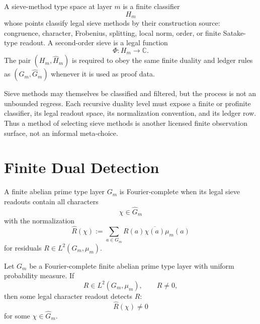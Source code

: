 \begin{definition}
\label{def:rh-sieve-method-type-space}
A sieve-method type space at layer $m$ is a finite classifier
$$
H_m
$$
whose points classify legal sieve methods by their construction source:
congruence, character, Frobenius, splitting, local norm, order, or
finite Satake-type readout.  A second-order sieve is a legal function
$$
\Phi:H_m\to\mathbb C.
$$
The pair $(H_m,\widehat H_m)$ is required to obey the same finite
duality and ledger rules as $(G_m,\widehat G_m)$ whenever it is used as
proof data.
\end{definition}

\begin{principle}
\label{prin:rh-recursive-duality-ledger-bounded}
Sieve methods may themselves be classified and filtered, but the
process is not an unbounded regress.  Each recursive duality level must
expose a finite or profinite classifier, its legal readout space, its
normalization convention, and its ledger row.  Thus a method of
selecting sieve methods is another licensed finite observation surface,
not an informal meta-choice.
\end{principle}

\section{Finite Dual Detection}
\label{sec:rh-prime-sieve-duality-finite-detection}

\begin{definition}
\label{def:rh-fourier-complete-sieve-layer}
A finite abelian prime type layer $G_m$ is Fourier-complete when its
legal sieve readouts contain all characters
$$
\chi\in\widehat G_m
$$
with the normalization
$$
\widehat R(\chi)
:=
\sum_{a\in G_m}R(a)\overline{\chi(a)}\mu_m(a)
$$
for residuals $R\in L^2(G_m,\mu_m)$.
\end{definition}

\begin{theorem}
\label{thm:rh-fourier-complete-finite-layers-detect-nonzero-residuals}
Let $G_m$ be a Fourier-complete finite abelian prime type layer with
uniform probability measure.  If
$$
R\in L^2(G_m,\mu_m),
\qquad
R\ne0,
$$
then some legal character readout detects $R$:
$$
\widehat R(\chi)\ne0
$$
for some $\chi\in\widehat G_m$.
\end{theorem}

